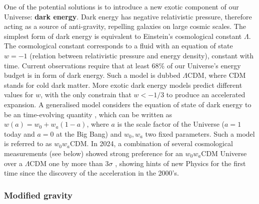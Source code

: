 One of the potential solutions is to introduce a new exotic component of our Universe:
 \textbf{dark energy}. 
Dark energy has negative relativistic pressure, therefore acting as 
a source of anti-gravity, repelling galaxies on large cosmic scales. 
The simplest form of dark energy is equivalent to Einstein's cosmological constant $\Lambda$. 
The cosmological constant corresponds to a fluid with an equation of state  $w = -1$ 
(relation between relativistic pressure and energy density), constant with time.  
Current observations require that at least 68\% of our Universe's energy budget is 
in form of dark energy. Such a model is dubbed $\Lambda$CDM, where CDM stands 
for cold dark matter.
More exotic dark energy models predict different values for $w$, with the only constrain 
that $w < -1/3$ to produce an accelerated expansion.  
A generalised model considers the equation of state of dark energy to be 
an time-evolving quantity
\cite{chevallierAcceleratingUniversesScaling2001,linderExploringExpansionHistory2003}, 
which can be written as $w(a) = w_0 + w_a(1-a)$, where $a$ is the scale factor 
of the Universe 
($a=1$ today and $a=0$ at the Big Bang) and $w_0, w_a$ two fixed parameters.
Such a model is referred to as $w_0w_a$CDM.  
In 2024, a combination of several cosmological measurements (see below) 
showed strong preference for an $w_0w_a$CDM Universe over a $\Lambda$CDM one by  
more than 3$\sigma$  
\cite{desicollaborationDESIDR2Results2025}, showing hints of new Physics 
for the first time since the discovery of the acceleration in the 2000's. 

\subsubsection*{Modified gravity}

